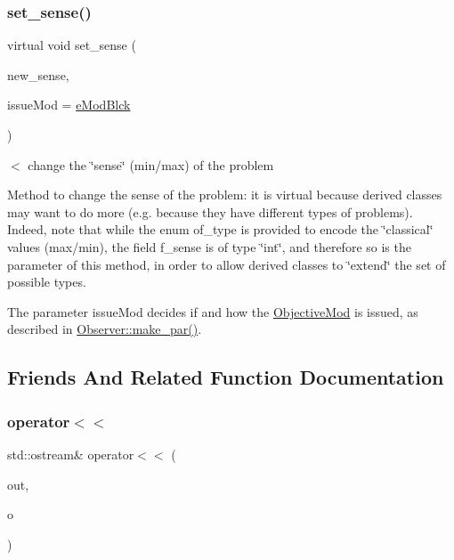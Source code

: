 \subsubsection{\texorpdfstring{set\+\_\+sense()}{set\_sense()}}
{\footnotesize\ttfamily virtual void set\+\_\+sense (\begin{DoxyParamCaption}\item[{int}]{new\+\_\+sense,  }\item[{\mbox{\hyperlink{group___modification___t_y_p_e_s_ga544246d8c462e9a2d817c2c30797968f}{c\+\_\+\+Mod\+Param}}}]{issue\+Mod = {\ttfamily \mbox{\hyperlink{group___modification___t_y_p_e_s_gga48fddcdd03a03f49b7e389ca1ed938d4a21b14b26b1c0093a0905f6fc010bad29}{e\+Mod\+Blck}}} }\end{DoxyParamCaption})\hspace{0.3cm}{\ttfamily [virtual]}}



$<$ change the \char`\"{}sense\char`\"{} (min/max) of the problem 

Method to change the sense of the problem\+: it is virtual because derived classes may want to do more (e.\+g. because they have different types of problems). Indeed, note that while the enum of\+\_\+type is provided to encode the \char`\"{}classical\char`\"{} values (max/min), the field f\+\_\+sense is of type \char`\"{}int\char`\"{}, and therefore so is the parameter of this method, in order to allow derived classes to \char`\"{}extend\char`\"{} the set of possible types.

The parameter issue\+Mod decides if and how the \mbox{\hyperlink{class_s_m_spp__di__unipi__it_1_1_objective_mod}{Objective\+Mod}} is issued, as described in \mbox{\hyperlink{class_s_m_spp__di__unipi__it_1_1_observer_a2d499ae38e5e95cf66cd71da32b0694a}{Observer\+::make\+\_\+par()}}. 

\subsection{Friends And Related Function Documentation}
\mbox{\label{class_s_m_spp__di__unipi__it_1_1_objective_a204a6bc05702d546cc2f487ce03ddac9}} 
\subsubsection{\texorpdfstring{operator$<$$<$}{operator<<}}
{\footnotesize\ttfamily std\+::ostream\& operator$<$$<$ (\begin{DoxyParamCaption}\item[{std\+::ostream \&}]{out,  }\item[{const \mbox{\hyperlink{class_s_m_spp__di__unipi__it_1_1_objective}{Objective}} \&}]{o }\end{DoxyParamCaption})\hspace{0.3cm}{\ttfamily [friend]}}



